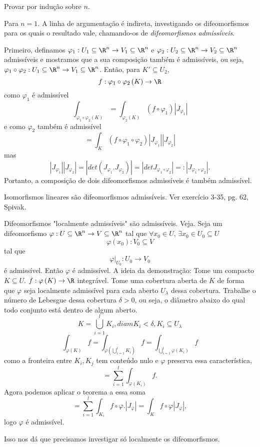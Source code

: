 Provar por indução sobre $n$.

Para $n=1$. A linha de argumentação é indireta, investigando os difeomorfismos para os quais o resultado vale, chamando-os de \emph{difeomorfismos admissíveis}.

Primeiro, definamos $\varphi_1 : U_1\subseteq\R^{n}\to V_1\subseteq\R^{n}$ e $\varphi_2 : U_2\subseteq\R^{n}\to V_2\subseteq\R^{n}$ admissíveis e mostramos que a sua composição também é admissíveis, ou seja, $\varphi_1\circ \varphi_2 : U_1\subseteq\R^{n}\to V_1\subseteq\R^{n}$. Então, para $K'\subseteq U_2$, \[
f : \varphi_1\circ \varphi_2 \left( K \right) \to \R
\] como $\varphi_1$ é admissível \[
\int_{\varphi_1\circ \varphi_2\left( K \right) } = \int_{\varphi_2\left( K \right) }\left( f\circ \varphi_1 \right) \left| J_{\varphi_1} \right| 
\] e como $\varphi_2$ também é admissível \[
= \int_{K}\left( f\circ \varphi_1\circ \varphi_2 \right) \left| J_{\varphi_1}   \right|\left|  J_{\varphi_2} \right| 
\]  mas \[
\left| J_{\varphi_1}   \right|\left|  J_{\varphi_2} \right| = \left| det\left( J_{\varphi_1}.J_{\varphi_2} \right)  \right| = \left| det J_{\varphi_1\circ \varphi_2} \right| =: \left| J_{\varphi_1\circ \varphi_2} \right| 
.\] Portanto, a composição de dois difeomorfismos admissíveis é também admissível.

Isomorfismos lineares são difeomorfismos admissíveis. Ver exercício 3-35, pg. 62, Spivak.

Difeomorfismos "localmente admissíveis" são admissíveis. Veja. Seja um difeomorfismo $\varphi: U\subseteq\R^{n}\to V\subseteq\R^{n}$ tal que $\forall x_0\in U$, $\exists x_0\in U_0 \subseteq U$ \[
\varphi\left( x_0 \right) : V_0\subseteq V
\] tal que \[
\varphi\Big|_{U_0}: U_0 \to V_0
\] é admissível. Então $\varphi$ é admissível. A ideia da demonstração:
Tome um compacto $K\subseteq U$. $f:\varphi\left( K \right) \to \R$ integrável. Tome uma cobertura aberta de $K$ de forma que $\varphi$ seja localmente admissível para cada aberto $U_\lambda$ dessa cobertura. Trabalhe o número de Lebesgue dessa cobertura $\delta > 0$, ou seja, o diâmetro abaixo do qual todo conjunto está dentro de algum aberto. \[
K = \bigcup_{i=1}^{l} K_i, diam K_i < \delta, K_i \subseteq U_\lambda
\] \[
\int_{\varphi\left( K \right) }f = \int_{\varphi\left( \bigcup_{i=1} ^{l}K_i \right) } f = \int_{\bigcup_{i=1} ^{l}\varphi\left( K_i \right) } f
\] como a fronteira entre $K_i, K_j$ tem conteúdo nulo e $\varphi$ preserva essa característica, \[
= \sum_{i=1}^{l} \int_{\varphi\left( K_i \right) } f
.\] Agora podemos aplicar o teorema a essa soma \[
= \sum_{i=1}^{l} \int_{K_i}f\circ \varphi . \left| J_{\varphi} \right| = \int_K f\circ \varphi \left| J_{\varphi} \right| 
,\] logo $\varphi$ é admissível.

Isso nos dá que precisamos investigar só localmente os difeomorfismos.

